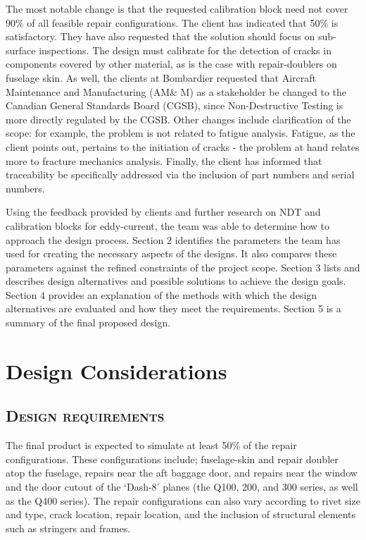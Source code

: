 \documentclass[12pt]{article}
\begin{document}
The most notable change is that the requested calibration block need not cover 90\% of all feasible repair configurations. The client has indicated that 50\% is satisfactory. They have also requested that the solution should focus on sub-surface inspections. The design must calibrate for the detection of cracks in components covered by other material, as is the case with repair-doublers on fuselage skin. As well, the clients at Bombardier requested that Aircraft Maintenance and Manufacturing (AM\& M) as a stakeholder be changed to the Canadian General Standards Board (CGSB), since Non-Destructive Testing is more directly regulated by the CGSB. Other changes include clarification of the scope: for example, the problem is not related to fatigue analysis. Fatigue, as the client points out, pertains to the initiation of cracks - the problem at hand relates more to fracture mechanics analysis. Finally, the client has informed that traceability be specifically addressed via the inclusion of part numbers and serial numbers.

Using the feedback provided by clients and further research on NDT and calibration blocks for eddy-current, the team was able to determine how to approach the design process. Section 2 identifies the parameters the team has used for creating the necessary aspects of the designs. It also compares these parameters against the refined constraints of the project scope. Section 3 lists and describes design alternatives and possible solutions to achieve the design goals. Section 4 provides an explanation of the methods with which the design alternatives are evaluated and how they meet the requirements. Section 5 is a summary of the final proposed design.

\section{Design Considerations}
\subsection{\textsc{Design requirements}} 

The final product is expected to simulate at least 50\% of the repair configurations. These configurations include; fuselage-skin and repair doubler atop the fuselage, repairs near the aft baggage door, and repairs near the window and the door cutout of the `Dash-8' planes (the Q100, 200, and 300 series, as well as the Q400 series). The repair configurations can also vary according to rivet size and type, crack location, repair location, and the inclusion of structural elements such as stringers and frames. 
\end{document}
